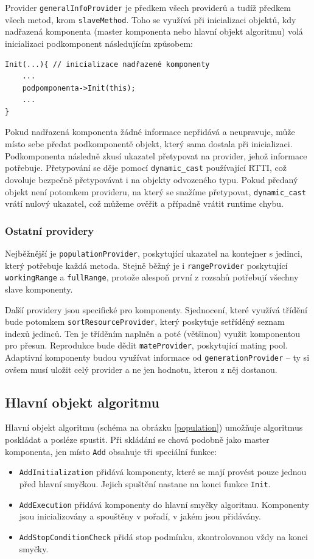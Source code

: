 Provider \texttt{generalInfoProvider} je předkem všech providerů a tudíž předkem všech metod, krom \texttt{slaveMethod}. Toho se využívá při inicializaci objektů, kdy nadřazená komponenta (master komponenta nebo hlavní objekt algoritmu) volá inicializaci podkomponent následujícím způsobem:
\begin{verbatim}
Init(...){ // inicializace nadřazené komponenty
    ...
    podpomponenta->Init(this);
    ...
}
\end{verbatim}
Pokud nadřazená komponenta žádné informace nepřidává a neupravuje, může místo sebe předat podkomponentě objekt, který sama dostala při inicializaci. Podkomponenta následně zkusí ukazatel přetypovat na provider, jehož informace potřebuje. Přetypování se děje pomocí \texttt{dynamic\_cast} používající RTTI, což dovoluje bezpečně přetypovávat i na objekty odvozeného typu. Pokud předaný objekt není potomkem provideru, na který se snažíme přetypovat, \texttt{dynamic\_cast} vrátí nulový ukazatel, což můžeme ověřit a případně vrátit runtime chybu.

\subsubsection{Ostatní providery}

Nejběžnější je \texttt{populationProvider}, poskytující ukazatel na kontejner s jedinci, který potřebuje každá metoda. Stejně běžný je i \texttt{rangeProvider} poskytující \texttt{workingRange} a \texttt{fullRange}, protože alespoň první z rozsahů potřebují všechny slave komponenty.

Další providery jsou specifické pro komponenty. Sjednocení, které využívá třídění bude potomkem \texttt{sortResourceProvider}, který poskytuje setříděný seznam indexů jedinců. Ten je tříděním naplněn a poté (většinou) využit komponentou pro přesun. Reprodukce bude dědit \texttt{mateProvider}, poskytující mating pool. Adaptivní komponenty budou využívat informace od \texttt{generationProvider} -- ty si ovšem musí uložit celý provider a ne jen hodnotu, kterou z něj dostanou.

\subsection{Hlavní objekt algoritmu}

Hlavní objekt algoritmu (schéma na obrázku \ref{population}) umožňuje algoritmus poskládat a posléze spustit. Při skládání se chová podobně jako master komponenta, jen místo \texttt{Add} obsahuje tři speciální funkce:
\begin{itemize}
  \item \texttt{AddInitialization} přidává komponenty, které se mají provést pouze jednou před hlavní smyčkou. Jejich spuštění nastane na konci funkce \texttt{Init}.
  \item \texttt{AddExecution} přidává komponenty do hlavní smyčky algoritmu. Komponenty jsou inicializovány a spouštěny v pořadí, v jakém jsou přidávány.
  \item \texttt{AddStopConditionCheck} přidá stop podmínku, zkontrolovanou vždy na konci smyčky.
\end{itemize}

